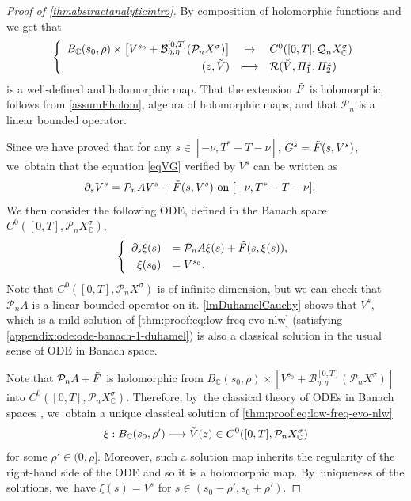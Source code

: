 \documentclass[10pt]{amsart}
\newcommand\mto{\mathchoice{\longmapsto}{\mapsto}{\mapsto}{\mapsto}}
\theoremstyle{definition}
\let\mc\mathcal
\newcommand{\B}{\mc{B}}
\newcommand{\Q}{\mathcal{Q}}
\renewcommand{\P}{\mathcal{P}}
\let\dpl\displaystyle
\begin{document}
\begin{proof}[Proof of \cref{thmabstractanalyticintro}]
By composition of holomorphic functions and \cite[Prop.\,8.10]{Muj86} we get that
\begin{align*}
\left\{\begin{array}{rcl}
B_{\mathbb{C}}(s_0, \rho)\times \bigl[V^{s_0}+\B_{\eta,\eta}^{[0,T]}(\P_n X^{\sigma})\bigr]&\dpl\to& C^0([0, T], \Q_n X_\mathbb{C}^\sigma)\\[3pt]
(z,\Tilde{V})&\dpl\mto& \mathcal{R}(\Tilde{V},H_{1}^z,H_{2}^z)
\end{array}\right.
\end{align*}
is a well-defined and holomorphic map. That the extension $\Tilde{F}$ is holomorphic, follows from \cref{assumFholom}, algebra of holomorphic maps, and that $\P_n$ is a linear bounded operator.

Since we have proved that for any $s\in [-\nu, T^*-T-\nu]$, $G^s=\Tilde{F}(s,V^s)$, we~obtain that the equation \eqref{eqVG} verified by $V^s$ can be written as
\begin{align*}
\partial_s V^s=\P_n AV^s+\Tilde{F}(s,V^s)& \textnormal{ on } [-\nu, T^*-T-\nu].
\end{align*}
We then consider the following ODE, defined in the Banach space $C^0([0, T], \P_n X_\mathbb{C}^\sigma)$,
\begin{align}\label{thm:proof:eq:low-freq-evo-nlw}
\left\{\begin{array}{rl}
\partial_s \xi(s)&=\P_nA\xi(s)+\Tilde{F}(s, \xi(s)), \\[3pt]
\xi(s_0)&=V^{s_0}.
\end{array}\right.
\end{align}
Note that $C^0([0,T], \P_n X^\sigma)$ is of infinite dimension, but we can check that $\P_n A$ is a linear bounded operator on it. \cref{lmDuhamelCauchy} shows that $V^s$, which is a mild solution of \eqref{thm:proof:eq:low-freq-evo-nlw} (\ie satisfying \eqref{appendix:ode:ode-banach-1-duhamel}) is also a classical solution in the usual sense of ODE in Banach space.

Note that $\P_n A+\Tilde{F}$ is holomorphic from $ B_{\mathbb{C}}(s_0, \rho)\times \left[V^{s_0}+ \B_{\eta,\eta}^{[0,T]}(\P_n X^{\sigma})\right]$ into $C^0([0, T], \P_n X_{\mathbb{C}}^\sigma)$. Therefore, by~the classical theory of ODEs in Banach spaces \cite[Th.\,10.4.5]{1969:dieudonne:modern-analysis}, we~obtain a unique classical solution of \eqref{thm:proof:eq:low-freq-evo-nlw}
\begin{align*}
\xi:B_{\mathbb{C}}(s_0, \rho')\mto \Tilde{V}(z)\in C^0([0,T], \P_n X_{\mathbb{C}}^\sigma)
\end{align*}
for some $\rho'\in (0, \rho]$. Moreover, such a solution map inherits the regularity of the right-hand side of the ODE and so it is a holomorphic map. By~uniqueness of the solutions, we~have $\xi(s)=V^s$ for $s\in (s_0-\rho',s_0+\rho')$.


\end{proof}
\end{document}
